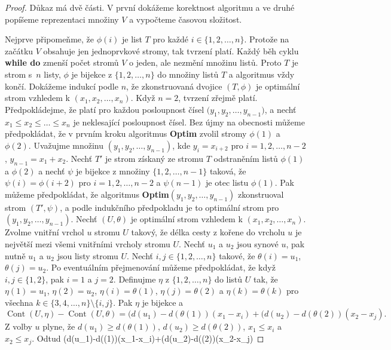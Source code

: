 \documentclass[a4paper,12pt]{article}
\DeclareMathOperator*{\Cont}{Cont}
\begin{document}
\begin{proof}Důkaz má dvě části. V 
první dokážeme korektnost algoritmu a ve druhé popíšeme 
reprezentaci množiny $V$ a vypočteme časovou složitost.

Nejprve připomeňme, že $\phi (i)$ je list $T$ 
pro každé $i\in \{1,2,\dots,n\}$.  Protože na začátku $
V$ 
obsahuje jen 
jednoprvko\-vé stromy, tak tvrzení platí.  Každý běh cyklu 
{\bf while do} zmenší počet stromů $V$ o jeden, ale nezmění 
množinu listů.  Proto $T$ je strom s~$n$ listy, $\phi$ je 
bijekce z $\{1,2,\dots,n\}$ do množiny listů $T$ a algoritmus 
vždy končí.  Dokážeme indukcí podle $n$, že zkonstruovaná 
dvojice $(T,\phi )$ je optimální strom vzhledem k $(x_1,x_2
,\dots,x_n)$.  
Když $n=2$, tvrzení zřejmě platí.  Předpokládejme, že 
platí pro každou posloupnost čísel $(y_1,y_2,\dots,$$
y_{n-1})$, a 
nechť $x_1\le x_2\le\dots\le x_n$ je neklesající posloupnost čísel.  Bez újmy na 
obecnosti můžeme předpokládat, že v prvním kroku 
algoritmus {\bf Optim} zvolil stromy $\phi (1)$ a $\phi (2)$.  Uvažujme množinu 
$(y_1,y_2,\dots,y_{n-1})$, kde $y_i=x_{i+2}$ pro $i=1,2,\dots,n-2$, 
$y_{n-1}=x_1+x_2$.  Nechť $T'$ je strom získaný ze stromu $
T$  
odstraněním listů $\phi (1)$ a $\phi (2)$ a nechť $
\psi$ je bijekce z 
množiny $\{1,2,\dots,n-1\}$ taková, že $\psi (i)=\phi (i+
2)$ pro 
$i=1,2,\dots,n-2$ a $\psi (n-1)$ je otec listu $\phi (1)$.  Pak 
můžeme předpokládat, že algoritmus 
{\bf Optim$(y_1,y_2,\dots,y_{n-1})$} zkonstruoval strom $(T',\psi 
)$, a podle indukčního 
předpokladu je to optimální strom pro $(y_1,y_2,\dots,y_{
n-1})$.  Nechť 
$(U,\theta )$ je optimální strom vzhledem k $(x_1,x_2,\dots
,x_n)$.  Zvolme 
vnitřní vrchol $u$ stromu $U$ takový, že délka cesty z kořene 
do vrcholu $u$ je nej\-větší mezi všemi vnitřními vrcholy 
stromu $U$.  Nechť $u_1$ a $u_2$ jsou synové $u$, pak nutně $
u_1$ 
a $u_2$ jsou listy stromu $U$.  Nechť $i,j\in \{1,2,\dots,n\}$ takové, že 
$\theta (i)=u_1$, $\theta (j)=u_2$.  Po eventuálním přejmenování můžeme 
předpokládat, že když $i,j\in \{1,2\}$, pak $i=1$ a 
$j=2$.  Definujme $\eta$ z $\{1,2,\dots,n\}$ do listů $U$ tak, že 
$\eta (1)=u_1$, $\eta (2)=u_2$, $\eta (i)=\theta (1)$, $\eta (j)=
\theta (2)$ a $\eta (k)=\theta (k)$ pro 
všechna $k\in \{3,4,\dots,n\}\setminus \{i,j\}$.  Pak $\eta$ je bijekce a 
$$\Cont(U,\eta )-\Cont(U,\theta )=(d(u_1)-d(\theta (1))(x_1-x_i)+
(d(u_2)-d(\theta (2))(x_2-x_j).$$
Z volby $u$ plyne, že $d(u_1)\ge d(\theta (1))$, $d(u_2)\ge d(
\theta (2))$, 
$x_1\le x_i$ a $x_2\le x_j$. Odtud  
$$(d(u_1)-d(\theta (1))(x_1-x_i)+(d(u_2)-d(\theta (2))(x_2-x_j)\le 

\end{proof}
\end{document}
